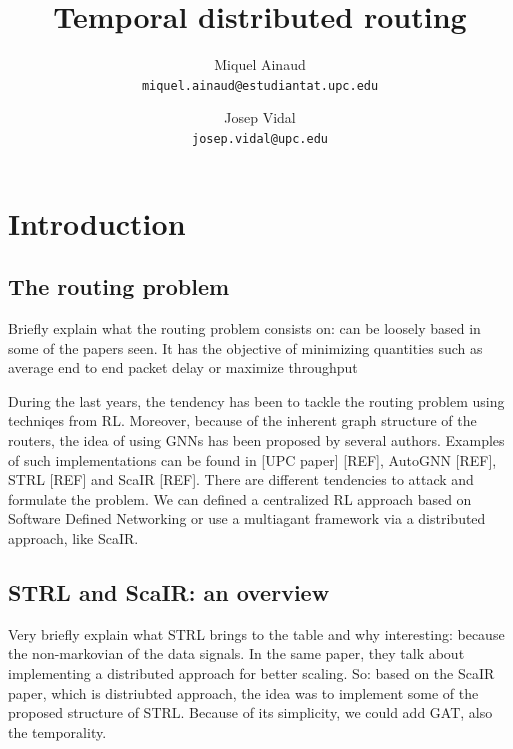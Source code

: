 \documentclass[10pt,twocolumn,letterpaper]{article}
\begin{document}
\title{Temporal distributed routing}

\author{Miquel Ainaud\\
{\tt\small miquel.ainaud@estudiantat.upc.edu}
\and
Josep Vidal\\
{\tt\small josep.vidal@upc.edu}
}

\maketitle

\begin{abstract}

\end{abstract}

\section{Introduction}
\subsection{The routing problem}

Briefly explain what the routing problem consists on: can be loosely based in some of the papers seen.
It has the objective of minimizing quantities such as average end to end packet delay or maximize throughput

During the last years, the tendency has been to tackle the routing problem using techniqes from RL. Moreover, because of the inherent graph structure of the routers, the idea of using GNNs has been proposed by several authors. Examples of such implementations can be found in [UPC paper] [REF], AutoGNN [REF], STRL [REF] and ScaIR [REF].
There are different tendencies to attack and formulate the problem. We can defined a centralized RL approach based on Software Defined Networking or use a multiagant framework via a distributed approach, like ScaIR.

\subsection{STRL and ScaIR: an overview}
Very briefly explain what STRL brings to the table and why interesting: because the non-markovian of the data signals. In the same paper, they talk about implementing a distributed approach for better scaling.
So: based on the ScaIR paper, which is distriubted approach, the idea was to implement some of the proposed structure of STRL. Because of its simplicity, we could add GAT, also the temporality.
\end{document}
